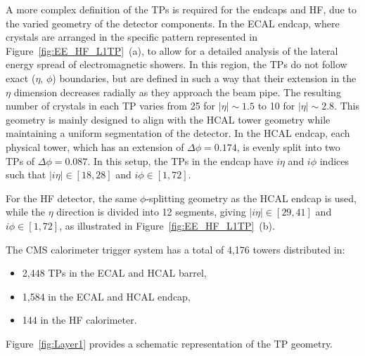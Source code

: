 A more complex definition of the TPs is required for the endcaps and HF, due to the varied geometry of the detector components.
In the ECAL endcap, where crystals are arranged in the specific pattern represented in Figure~\ref{fig:EE_HF_L1TP}~(a), to allow for a detailed analysis of the lateral energy spread of electromagnetic showers. In this region, the TPs do not follow exact ($\eta$, $\phi$) boundaries, but are defined in such a way that their extension in the $\eta$ dimension decreases radially as they approach the beam pipe. The resulting number of crystals in each TP varies from 25 for $|\eta|\sim1.5$ to 10 for $|\eta|\sim2.8$. 
This geometry is mainly designed to align with the HCAL tower geometry while maintaining a uniform segmentation of the detector.
In the HCAL endcap, each physical tower, which has an extension of $\Delta\phi = 0.174$, is evenly split into two TPs of $\Delta\phi = 0.087$. 
In this setup, the TPs in the endcap have $i\eta$ and $i\phi$ indices such that $|i\eta| \in [18,28]$ and $i\phi \in [1,72]$. 

For the HF detector, the same $\phi$-splitting geometry as the HCAL endcap is used, while the $\eta$ direction is divided into 12 segments, giving $|i\eta| \in [29,41]$ and $i\phi \in [1,72]$, as illustrated in Figure~\ref{fig:EE_HF_L1TP}~(b).

The CMS calorimeter trigger system has a total of 4,176 towers distributed in: 
\begin{itemize}
    \item 2,448 TPs in the ECAL and HCAL barrel,
    \item 1,584 in the ECAL and HCAL endcap,
    \item 144 in the HF calorimeter.
\end{itemize}
Figure~\ref{fig:Layer1} provides a schematic representation of the TP geometry. 

